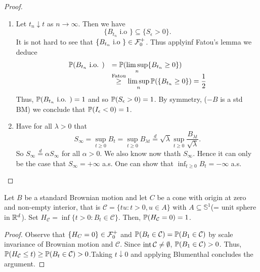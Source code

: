 \documentclass{article}
\begin{document}
\begin{proof}
	\begin{enumerate}
		\item Let $ t_{n}\downarrow t$ as $ n\to \infty$. Then we have 
			\[
				\{B_{t_{n}} \text{ i.o }\}\subseteq \{S_{\epsilon}>0\}.
			\]
		It is not hard to see that $\{B_{t_{n}} \text{ i.o }\} \in \mathcal{F}^{+}_{0}$. Thus applyinf Fatou's lemma we deduce 
		\[
		\begin{array}{ll}
			\mathbb{P}(B_{t_{n}} \text{ i.o. }) &= \mathbb{P}(\displaystyle\limsup_{n} \{B_{t_{n}}\geq 0\}) \\
						     &\stackrel{\text{Fatou}}{\geq}\displaystyle\limsup_{n} \mathbb{P} (\{B_{t_{n}}\geq 0\}) = \frac{1}{2}
		\end{array}
		\]
		Thus, $\mathbb{P}(B_{t_{n}} \text{ i.o. })= 1 $ and so $ \mathbb{P}(S_{\epsilon}>0) = 1$. By symmetry, ($-B$ is a std BM) we conclude that $ \mathbb{P}(I_{\epsilon}<0) = 1$.
	\item Have for all $ \lambda >0$ that
		\[
			S_{\infty} = \displaystyle\sup_{t\geq 0}B_{t} = \displaystyle\sup_{t\geq 0}B_{\lambda t} \stackrel{d}{=} \sqrt{\lambda}\displaystyle\sup_{t\geq 0}\frac{B_{\lambda t}}{\sqrt{\lambda}}.
	\]
	So $ S_{\infty} \stackrel{d}{=} \alpha S_{\infty}$ for all $ \alpha >0$. We also know now thath $ S_{\infty}$. Hence it can only be the case that $ S_{\infty} = +\infty$ a.s. One can show that $ \displaystyle\inf_{t\geq 0}B_{t} = -\infty$ a.s.
	\end{enumerate}
\end{proof}

\begin{boxprop}\label{prop: bm cone}
Let $ B$ be a standard Brownian motion and let $ C$ be a cone with origin at zero and non-empty interior, that is $ \mathcal{C} = \{tu: t>0, u\in A\}$ with $ A\subseteq \mathbb{S}^{1} $(= unit sphere in $ \mathbb{R}^{d}$). Set $ H_{ \mathcal{C}} = \displaystyle\inf\{t>0: B_{t}\in \mathcal{C}\}$. Then, $ \mathbb{P}(H_{ \mathcal{C}}=0)=1$.
\end{boxprop}

\begin{proof}
	Observe that $ \{H_{C}=0\}\in \mathcal{F}^{+}_{0}$ and $ \mathbb{P}(B_{t}\in \mathcal{C}) = \mathbb{P}(B_{1}\in \mathcal{C})$ by scale invariance of Brownian motion and $ \mathcal{C}$. Since $ \operatorname{int}{ \mathcal{C}}\neq \emptyset$, $ \mathbb{P}(B_{1}\in \mathcal{C})>0$. Thus, $ \mathbb{P}(H_{ \mathcal{C}}\leq t)\geq \mathbb{P}(B_{t}\in \mathcal{C})>0$.Taking $ t\downarrow 0$ and applying Blumenthal concludes the argument.
\end{proof}
\end{document}
